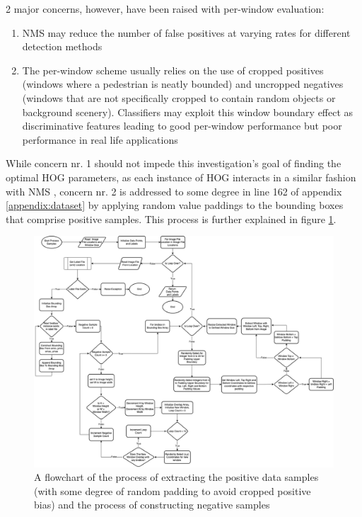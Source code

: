     2 major concerns, however, have been raised with per-window evaluation: 
    \begin{enumerate}
        \item NMS may reduce the number of false positives at varying rates for different detection methods \cite{dollar_2009_pedestrian}
        \item The per-window scheme usually relies on the use of cropped positives (windows where a pedestrian is neatly bounded) and uncropped negatives (windows that are not specifically cropped to contain random objects or background scenery). Classifiers may exploit this window boundary effect as discriminative features leading to good per-window performance but poor performance in real life applications \cite{dollar_2009_pedestrian}
    \end{enumerate} 

    While concern nr. 1 should not impede this investigation's goal of finding the optimal HOG parameters, as each instance of HOG interacts in a similar fashion with NMS \cite{dalal_2005_histograms}, concern nr. 2 is addressed to some degree in line 162 of appendix \ref{appendix:dataset} by applying random value paddings to the bounding boxes that comprise positive samples. This process is further explained in figure \ref{fig:dataset_low}.

    \begin{figure}
        \centering
        \includegraphics[width=\linewidth]{images/ee_dataset_low.drawio (1).png}
        \caption{A flowchart of the process of extracting the positive data samples (with some degree of random padding to avoid cropped positive bias) and the process of constructing negative samples }
        \label{fig:dataset_low}
    \end{figure}

